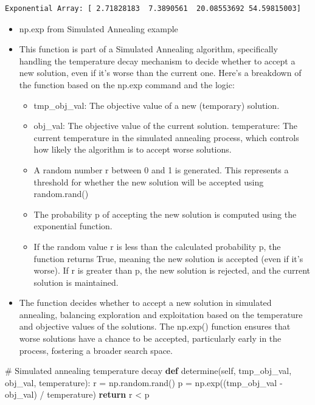 \documentclass[
  letterpaper,
  DIV=11,
  numbers=noendperiod]{scrreprt}
\newenvironment{Shaded}{\begin{snugshade}}{\end{snugshade}}
\newcommand{\CommentTok}[1]{\textcolor[rgb]{0.37,0.37,0.37}{#1}}
\newcommand{\ControlFlowTok}[1]{\textcolor[rgb]{0.00,0.23,0.31}{\textbf{#1}}}
\newcommand{\KeywordTok}[1]{\textcolor[rgb]{0.00,0.23,0.31}{\textbf{#1}}}
\newcommand{\NormalTok}[1]{\textcolor[rgb]{0.00,0.23,0.31}{#1}}
\newcommand{\OperatorTok}[1]{\textcolor[rgb]{0.37,0.37,0.37}{#1}}
\newcommand{\VariableTok}[1]{\textcolor[rgb]{0.07,0.07,0.07}{#1}}
\providecommand{\tightlist}{%
  \setlength{\itemsep}{0pt}\setlength{\parskip}{0pt}}\usepackage{longtable,booktabs,array}
\begin{document}
\begin{verbatim}
Exponential Array: [ 2.71828183  7.3890561  20.08553692 54.59815003]
\end{verbatim}

\begin{itemize}
\tightlist
\item
  np.exp from Simulated Annealing example
\item
  This function is part of a Simulated Annealing algorithm, specifically
  handling the temperature decay mechanism to decide whether to accept a
  new solution, even if it's worse than the current one. Here's a
  breakdown of the function based on the np.exp command and the logic:

  \begin{itemize}
  \tightlist
  \item
    tmp\_obj\_val: The objective value of a new (temporary) solution.
  \item
    obj\_val: The objective value of the current solution. temperature:
    The current temperature in the simulated annealing process, which
    controls how likely the algorithm is to accept worse solutions.
  \item
    A random number r between 0 and 1 is generated. This represents a
    threshold for whether the new solution will be accepted using
    random.rand()
  \item
    The probability p of accepting the new solution is computed using
    the exponential function.
  \item
    If the random value r is less than the calculated probability p, the
    function returns True, meaning the new solution is accepted (even if
    it's worse). If r is greater than p, the new solution is rejected,
    and the current solution is maintained.
  \end{itemize}
\item
  The function decides whether to accept a new solution in simulated
  annealing, balancing exploration and exploitation based on the
  temperature and objective values of the solutions. The np.exp()
  function ensures that worse solutions have a chance to be accepted,
  particularly early in the process, fostering a broader search space.
\end{itemize}

\begin{Shaded}
\begin{Highlighting}[]
\CommentTok{\# Simulated annealing temperature decay}
\KeywordTok{def}\NormalTok{ determine(}\VariableTok{self}\NormalTok{, tmp\_obj\_val, obj\_val, temperature):}
\NormalTok{     r }\OperatorTok{=}\NormalTok{ np.random.rand()}
\NormalTok{     p }\OperatorTok{=}\NormalTok{ np.exp((tmp\_obj\_val }\OperatorTok{{-}}\NormalTok{ obj\_val) }\OperatorTok{/}\NormalTok{ temperature)}
     \ControlFlowTok{return}\NormalTok{ r }\OperatorTok{\textless{}}\NormalTok{ p}
\end{Highlighting}
\end{Shaded}
\end{document}

